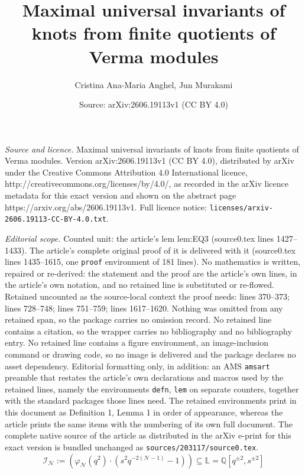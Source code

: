 \documentclass[10pt,a4paper]{amsart}
\title{Maximal universal invariants of knots from finite quotients of Verma modules}
\author{Cristina Ana-Maria Anghel, Jun Murakami}
\date{Source: arXiv:2606.19113v1 (CC BY 4.0)}
\newcommand{\Liq}{\mathbb L}
\newcommand{\Q}{\mathbb Q}
\newcommand{\cI}{\mathcal{I}}
\newcommand{\cN}{\mathcal{N}}
\begin{document}
\maketitle

\noindent\emph{Source and licence.} Maximal universal invariants of knots from finite quotients of Verma modules. Version arXiv:2606.19113v1 (CC BY 4.0), distributed by arXiv under the Creative Commons Attribution 4.0 International licence, http://creativecommons.org/licenses/by/4.0/, as recorded in the arXiv licence metadata for this exact version and shown on the abstract page https://arxiv.org/abs/2606.19113v1. Full licence notice: \texttt{licenses/arxiv-2606.19113-CC-BY-4.0.txt}.\par\smallskip

\noindent\textit{Editorial scope.} Counted unit: the article's lem lem:EQ3 (source0.tex lines 1427--1433). The article's complete original proof of it is delivered with it (source0.tex lines 1435--1615, one \texttt{proof} environment of 181 lines). No mathematics is written, repaired or re-derived: the statement and the proof are the article's own lines, in the article's own notation, and no retained line is substituted or re-flowed.  Retained uncounted as the source-local context the proof needs: lines 370--373; lines 728--748; lines 751--759; lines 1617--1620.  Nothing was omitted from any retained span, so the package carries no omission record.  No retained line contains a citation, so the wrapper carries no bibliography and no bibliography entry.  No retained line contains a figure environment, an image-inclusion command or drawing code, so no image is delivered and the package declares no asset dependency.  Editorial formatting only, in addition: an AMS \texttt{amsart} preamble that restates the article's own declarations and macros used by the retained lines, namely the environments \texttt{defn}, \texttt{lem} on separate counters, together with the standard packages those lines need.  The retained environments print in this document as Definition 1, Lemma 1 in order of appearance, whereas the article prints the same items with the numbering of its own full document.  The complete native source of the article as distributed in the arXiv e-print for this exact version is bundled unchanged as \texttt{sources/203117/source0.tex}.
\begin{equation}\label{qideal}
\cI_\cN:=\left(\varphi_\cN(q^2)\cdot (s^2q^{-2(\cN-1)}-1)\right)
\subseteq \Liq=\Q[q^{\pm2}, s^{\pm 2}]
\end{equation}
\end{document}
